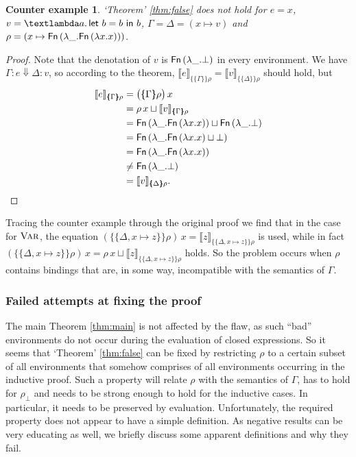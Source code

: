 \documentclass[twopage]{scrartcl}
\newtheorem{counterexample}[theorem]{Counter example}
\theoremstyle{nonumberbreak}
\newtheorem{proof}{Proof}
\newcommand{\sFn}[1]{\text{\textsf{Fn}}\,(#1)}
\newcommand{\sLam}[2]{\text{\textlambda} #1.\, #2}
\newcommand{\sLet}[2]{\text{\textsf{let}}\ #1\ \text{\textsf{in}}\ #2}
\newcommand{\sred}[4]{#1 : #2 \Downarrow #3 : #4}
\newcommand{\sRule}[1]{\text{{\textsc{#1}}}}
\newcommand{\dsem}[2]{\llbracket #1 \rrbracket_{#2}}
\newcommand{\esem}[1]{\{\!\!\!\{#1\}\!\!\!\}}
\begin{document}
\begin{counterexample}
`Theorem' \ref{thm:false} does not hold for $e = x$, $v = \sLam{a}{\sLet{b = b}b}$, $\Gamma = \Delta = (x \mapsto v)$ and $\rho = (x \mapsto \sFn{\lambda \_. \sFn{\lambda x.x}})$. 
\end{counterexample}

\begin{proof}
Note that the denotation of $v$ is $\sFn{\lambda \_. \bot}$ in every environment. We have $\sred\Gamma e\Delta v$, so according to the theorem, $\dsem{e}{\esem{\Gamma}{\rho}} = \dsem{v}{\esem{\Delta}{\rho}}$ should hold, but
\begin{align*}
\dsem{e}{\esem\Gamma\rho}
&= \big(\esem \Gamma\rho\big)\,x \\
&= \rho\,x \sqcup \dsem{v}{\esem{\Gamma}\rho}\\
&= \sFn{\lambda \_. \sFn{\lambda x.x}} \sqcup \sFn{\lambda \_. \bot} \\
&= \sFn{\lambda \_. \sFn{\lambda x.x} \sqcup \bot} \\
&= \sFn{\lambda \_. \sFn{\lambda x.x}} \\
& \ne \sFn{\lambda \_. \bot} \\
&= \dsem{v}{\esem{\Delta}{\rho}}.
\end{align*}
\end{proof}

Tracing the counter example through the original proof we find that in the case for $\sRule{Var}$, the equation $({\esem{\Delta, x\mapsto z}\rho})\, x = \dsem{z}{\esem{\Delta, x\mapsto z}\rho}$ is used, while in fact $({\esem{\Delta, x\mapsto z}\rho})\, x = \rho\, x \sqcup \dsem{z}{\esem{\Delta, x\mapsto z}\rho}$ holds. So the problem occurs when $\rho$ contains bindings that are, in some way, incompatible with the semantics of $\Gamma$.

\subsubsection{Failed attempts at fixing the proof}

The main Theorem \ref{thm:main} is not affected by the flaw, as such “bad” environments do not occur during the evaluation of closed expressions. So it seems that `Theorem' \ref{thm:false} can be fixed by restricting $\rho$ to a certain subset of all environments that somehow comprises of all environments occurring in the inductive proof. Such a property will relate $\rho$ with the semantics of $\Gamma$, has to hold for $\rho_\bot$ and needs to be strong enough to hold for the inductive cases. In particular, it needs to be preserved by evaluation. Unfortunately, the required property does not appear to have a simple definition. As negative results can be very educating as well, we briefly discuss some apparent definitions and why they fail.
\end{document}

